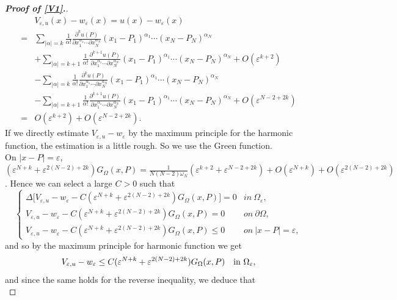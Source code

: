 \documentclass[10pt,a4paper]{amsart}
\renewcommand\O\Omega
\newcommand\e\varepsilon
\begin{document}
\begin{proof}[\bf Proof of \eqref{V1}.]
\begin{equation}\label{eq1901-1}
			\begin{aligned}
				&V_{\e,u}(x)-w_\e(x)=u(x)-w_\e(x)\\
				=&\sum_{|\alpha|=k}\frac1{\alpha!}
					\frac{\partial^ku(P)}{\partial x_1^{\alpha_1}\cdots\partial x_N^{\alpha_N}}(x_1-P_1)^{\alpha_1}\cdots(x_N-P_N)^{\alpha_N}\\
                    &+\sum_{|\alpha|=k+1}\frac1{\alpha!}
					\frac{\partial^{k+1}u(P)}{\partial x_1^{\alpha_1}\cdots\partial x_N^{\alpha_N}}(x_1-P_1)^{\alpha_1}\cdots(x_N-P_N)^{\alpha_N}+O(\e^{k+2})\\
				&-\sum_{|\alpha|=k}\frac1{\alpha!}
					\frac{\partial^ku(P)}{\partial x_1^{\alpha_1}\cdots\partial x_N^{\alpha_N}}(x_1-P_1)^{\alpha_1}\cdots(x_N-P_N)^{\alpha_N}\\
                    &-\sum_{|\alpha|=k+1}\frac1{\alpha!}
					\frac{\partial^{k+1}u(P)}{\partial x_1^{\alpha_1}\cdots\partial x_N^{\alpha_N}}(x_1-P_1)^{\alpha_1}\cdots(x_N-P_N)^{\alpha_N}+O(\e^{N-2+2k})\\
                    =&O(\e^{k+2})+O(\e^{N-2+2k}).
			\end{aligned}
            \end{equation}
		If we directly estimate $V_{\e,u}-w_\e$ by the maximum principle for the harmonic function, the estimation is a little rough. So we use the Green function.\\ On $|x-P|=\e$, $(\e^{N+k}+\e^{2(N-2)+2k})G_{\Omega}(x,P)=\frac1{N(N-2)\omega_N}(\e^{k+2}+\e^{N-2+2k})+O(\e^{N+k})+O(\e^{2(N-2)+2k})$. Hence we can select a large $C>0$ such that   
				\begin{equation}
					\begin{cases}
						\Delta\Big[V_{\e,u}-w_\e-C(\e^{N+k}+\e^{2(N-2)+2k})G_{\Omega}(x,P)\Big]=0&in\ \O_\e,\\
						V_{\e,u}-w_\e-C(\e^{N+k}+\e^{2(N-2)+2k})G_{\Omega}(x,P)=0&on\ \partial\O,\\
						V_{\e,u}-w_\e-C(\e^{N+k}+\e^{2(N-2)+2k})G_{\Omega}(x,P)\le 0&on\ |x-P|=\e,
					\end{cases}
				\end{equation}
				and so by the maximum principle for harmonic function we get
				\begin{equation}
					V_{\e,u}-w_\e \le C(\e^{N+k}+\e^{2(N-2)+2k})G_{\Omega}(x,P)\quad\hbox{in }\O_\e,
				\end{equation}
				and since the same holds for the reverse inequality, we deduce that \begin{equation}\label{eq-0922-1}

\end{equation}
\end{proof}
\end{document}

